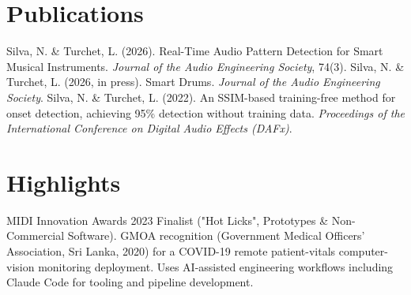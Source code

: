 \documentclass[11pt]{article}
\begin{document}
\section*{Publications}
Silva, N. \& Turchet, L. (2026). Real-Time Audio Pattern Detection for Smart Musical Instruments. \textit{Journal of the Audio Engineering Society}, 74(3). Silva, N. \& Turchet, L. (2026, in press). Smart Drums. \textit{Journal of the Audio Engineering Society}. Silva, N. \& Turchet, L. (2022). An SSIM-based training-free method for onset detection, achieving 95\% detection without training data. \textit{Proceedings of the International Conference on Digital Audio Effects (DAFx)}.

\section*{Highlights}
MIDI Innovation Awards 2023 Finalist ("Hot Licks", Prototypes \& Non-Commercial Software). GMOA recognition (Government Medical Officers' Association, Sri Lanka, 2020) for a COVID-19 remote patient-vitals computer-vision monitoring deployment. Uses AI-assisted engineering workflows including Claude Code for tooling and pipeline development.
\end{document}
